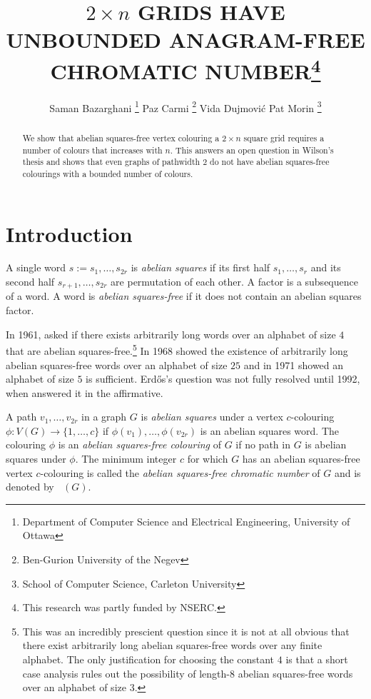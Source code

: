 \documentclass{patmorin}
\title{\MakeUppercase{$2\times n$ Grids have Unbounded Anagram-Free Chromatic Number}\thanks{This research was partly funded by NSERC.}}
\author{Saman Bazarghani%
    \thanks{Department of Computer Science and Electrical Engineering, University of Ottawa}\qquad
    Paz Carmi%
    \thanks{Ben-Gurion University of the Negev}\qquad
    Vida Dujmović\footnotemark[2]\qquad
    Pat Morin%
    \thanks{School of Computer Science, Carleton University}}
\date{}
\DeclareMathOperator{\afcn}{\dot{\chi}_\pi}
\begin{document}
\maketitle

\begin{abstract}
    We show that abelian squares-free vertex colouring a $2\times n$ square grid requires a number of colours that increases with $n$.  This answers an open question in Wilson's thesis and shows that even graphs of pathwidth $2$ do not have abelian squares-free colourings with a bounded number of colours.
\end{abstract}

%



\section{Introduction}

A single word $s:=s_1,\ldots,s_{2r}$ is \emph{abelian squares} if its first half $s_1,\ldots,s_r$ and its second half $s_{r+1},\ldots,s_{2r}$ are permutation of each other. A factor is a subsequence of a word.  A word is \emph{abelian squares-free} if it does not contain an abelian squares factor.

In 1961, \citet{erdos:some} asked if there exists arbitrarily long words over an alphabet of size $4$ that are abelian squares-free.\footnote{This was an incredibly prescient question since it is not at all obvious that there exist arbitrarily long abelian squares-free words over any finite alphabet. The only justification for choosing the constant $4$ is that a short case analysis rules out the possibility of length-$8$ abelian squares-free words over an alphabet of size $3$.}  In 1968 \citet{evdokimov:strongly,evdokimov:strongly2} showed the existence of arbitrarily long abelian squares-free words over an alphabet of size $25$ and in 1971 \citet{pleasants:non-repetitive} showed an alphabet of size $5$ is sufficient.  Erd\H{o}s's question was not fully resolved until 1992, when \citet{keranen:abelian} answered it in the affirmative.

A path $v_1,\ldots,v_{2r}$ in a graph $G$ is \emph{abelian squares} under a vertex $c$-colouring $\phi:V(G)\to\{1,\ldots,c\}$ if $\phi(v_1),\ldots,\phi(v_{2r})$ is an abelian squares word.  The colouring $\phi$ is an \emph{abelian squares-free colouring} of $G$ if no path in $G$ is abelian squares under $\phi$.  The minimum integer $c$ for which $G$ has an abelian squares-free vertex $c$-colouring is called the \emph{abelian squares-free chromatic number} of $G$ and is denoted by $\afcn(G)$.
\end{document}
